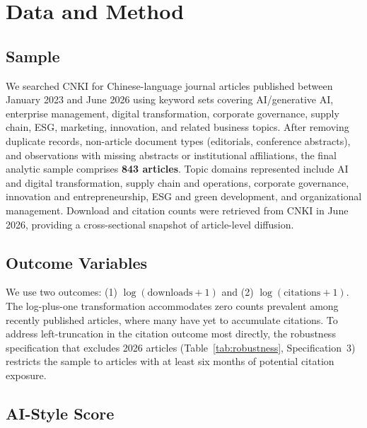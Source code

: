 \documentclass[12pt,a4paper]{article}
\begin{document}
\section{Data and Method}
\label{sec:method}

\subsection{Sample}

We searched CNKI for Chinese-language journal articles published
between January 2023 and June 2026 using keyword sets covering
AI/generative AI, enterprise management, digital transformation,
corporate governance, supply chain, ESG, marketing, innovation,
and related business topics.
After removing duplicate records, non-article document types
(editorials, conference abstracts), and observations with missing
abstracts or institutional affiliations, the final analytic sample
comprises \textbf{843 articles}.
Topic domains represented include AI and digital transformation,
supply chain and operations, corporate governance, innovation and
entrepreneurship, ESG and green development, and organizational
management.
Download and citation counts were retrieved from CNKI in June 2026,
providing a cross-sectional snapshot of article-level diffusion.

\subsection{Outcome Variables}

We use two outcomes: (1) $\log(\text{downloads}+1)$ and
(2) $\log(\text{citations}+1)$.
The log-plus-one transformation accommodates zero counts prevalent
among recently published articles, where many have yet to accumulate
citations.
To address left-truncation in the citation outcome most directly,
the robustness specification that excludes 2026 articles
(Table~\ref{tab:robustness}, Specification~3) restricts the sample
to articles with at least six months of potential citation exposure.

\subsection{AI-Style Score}
\end{document}

